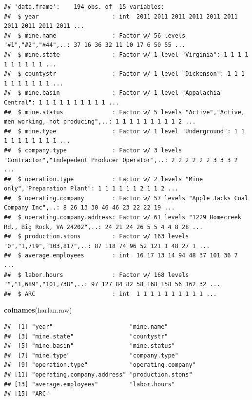 \documentclass[12pt,]{article}
\newenvironment{Shaded}{\begin{snugshade}}{\end{snugshade}}
\newcommand{\KeywordTok}[1]{\textcolor[rgb]{0.13,0.29,0.53}{\textbf{#1}}}
\newcommand{\NormalTok}[1]{#1}
\begin{document}
\begin{verbatim}
## 'data.frame':    194 obs. of  15 variables:
##  $ year                     : int  2011 2011 2011 2011 2011 2011 2011 2011 2011 2011 ...
##  $ mine.name                : Factor w/ 56 levels "#1","#2","#44",..: 37 16 36 32 11 10 17 6 50 55 ...
##  $ mine.state               : Factor w/ 1 level "Virginia": 1 1 1 1 1 1 1 1 1 1 ...
##  $ countystr                : Factor w/ 1 level "Dickenson": 1 1 1 1 1 1 1 1 1 1 ...
##  $ mine.basin               : Factor w/ 1 level "Appalachia Central": 1 1 1 1 1 1 1 1 1 1 ...
##  $ mine.status              : Factor w/ 5 levels "Active","Active, men working, not producing",..: 1 1 1 1 1 1 1 1 1 2 ...
##  $ mine.type                : Factor w/ 1 level "Underground": 1 1 1 1 1 1 1 1 1 1 ...
##  $ company.type             : Factor w/ 3 levels "Contractor","Indepedent Producer Operator",..: 2 2 2 2 2 2 3 3 3 2 ...
##  $ operation.type           : Factor w/ 2 levels "Mine only","Preparation Plant": 1 1 1 1 1 1 2 1 1 2 ...
##  $ operating.company        : Factor w/ 57 levels "Apple Jacks Coal Company Inc",..: 8 26 13 30 46 46 23 22 22 19 ...
##  $ operating.company.address: Factor w/ 61 levels "1229 Homecreek Rd., Big Rock, VA 24202",..: 24 21 24 26 5 5 4 4 8 28 ...
##  $ production.stons         : Factor w/ 163 levels "0","1,719","103,817",..: 87 118 74 96 52 121 1 48 27 1 ...
##  $ average.employees        : int  16 17 13 14 94 48 37 101 36 7 ...
##  $ labor.hours              : Factor w/ 168 levels "","1,689","101,738",..: 97 127 84 82 58 168 158 56 162 32 ...
##  $ ARC                      : int  1 1 1 1 1 1 1 1 1 1 ...
\end{verbatim}

\begin{Shaded}
\begin{Highlighting}[]
\KeywordTok{colnames}\NormalTok{(harlan.raw)}
\end{Highlighting}
\end{Shaded}

\begin{verbatim}
##  [1] "year"                      "mine.name"                
##  [3] "mine.state"                "countystr"                
##  [5] "mine.basin"                "mine.status"              
##  [7] "mine.type"                 "company.type"             
##  [9] "operation.type"            "operating.company"        
## [11] "operating.company.address" "production.stons"         
## [13] "average.employees"         "labor.hours"              
## [15] "ARC"
\end{verbatim}
\end{document}
